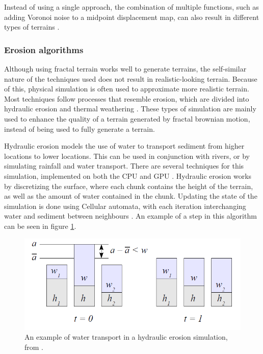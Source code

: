 \documentclass{article}
\begin{document}

Instead of using a single approach, the combination of multiple functions, such as adding Voronoi noise to a midpoint displacement map, can also result in different types of terrains \cite{olsen_realtime_2004}.

\subsubsection{Erosion algorithms}
Although using fractal terrain works well to generate terrains, the self-similar nature of the techniques used does not result in realistic-looking terrain. Because of this, physical simulation is often used to approximate more realistic terrain. Most techniques follow processes that resemble erosion, which are divided into hydraulic erosion and thermal weathering \cite{musgrave_synthesis_1989}. These types of simulation are mainly used to enhance the quality of a terrain generated by fractal brownian motion, instead of being used to fully generate a terrain.

Hydraulic erosion models the use of water to transport sediment from higher locations to lower locations. This can be used in conjunction with rivers, or by simulating rainfall and water transport. There are several techniques for this simulation, implemented on both the CPU and GPU \cite{benes_visual_2002} \cite{stava_interactive_2008}. Hydraulic erosion works by discretizing the surface, where each chunk contains the height of the terrain, as well as the amount of water contained in the chunk. Updating the state of the simulation is done using Cellular automata, with each iteration interchanging water and sediment between neighbours \cite{dambrosio_cellular_2001}. An example of a step in this algorithm can be seen in figure \ref{fig:hydraulic-erosion}.

\begin{figure}
    \centering
    \includegraphics[width=\textwidth]{figures/Hydraulic_erosion.PNG}
    \caption{An example of water transport in a hydraulic erosion simulation, from \cite{olsen_realtime_2004}.}
    \label{fig:hydraulic-erosion}
\end{figure}
\end{document}
